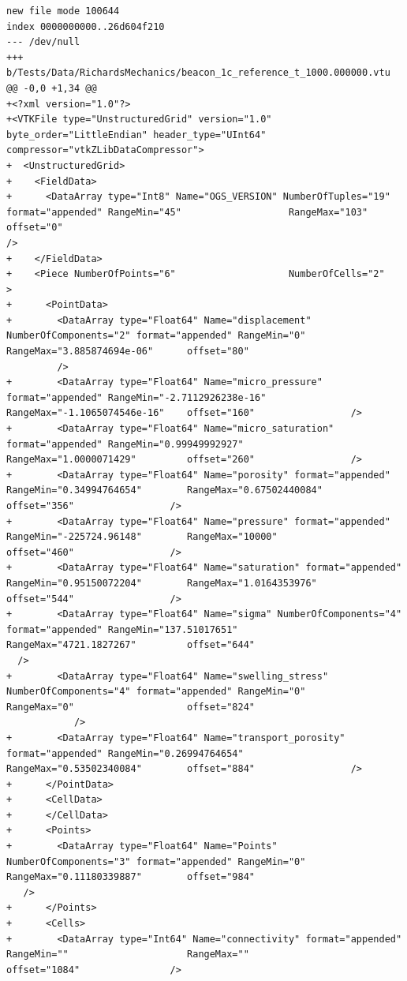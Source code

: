 \documentclass[10pt]{article}
\begin{document}
\begin{lstlisting}
new file mode 100644
index 0000000000..26d604f210
--- /dev/null
+++ b/Tests/Data/RichardsMechanics/beacon_1c_reference_t_1000.000000.vtu
@@ -0,0 +1,34 @@
+<?xml version="1.0"?>
+<VTKFile type="UnstructuredGrid" version="1.0" byte_order="LittleEndian" header_type="UInt64" compressor="vtkZLibDataCompressor">
+  <UnstructuredGrid>
+    <FieldData>
+      <DataArray type="Int8" Name="OGS_VERSION" NumberOfTuples="19" format="appended" RangeMin="45"                   RangeMax="103"                  offset="0"                   
/>
+    </FieldData>
+    <Piece NumberOfPoints="6"                    NumberOfCells="2"                   >
+      <PointData>
+        <DataArray type="Float64" Name="displacement" NumberOfComponents="2" format="appended" RangeMin="0"                    RangeMax="3.885874694e-06"      offset="80"         
         />
+        <DataArray type="Float64" Name="micro_pressure" format="appended" RangeMin="-2.7112926238e-16"    RangeMax="-1.1065074546e-16"    offset="160"                 />
+        <DataArray type="Float64" Name="micro_saturation" format="appended" RangeMin="0.99949992927"        RangeMax="1.0000071429"         offset="260"                 />
+        <DataArray type="Float64" Name="porosity" format="appended" RangeMin="0.34994764654"        RangeMax="0.67502440084"        offset="356"                 />
+        <DataArray type="Float64" Name="pressure" format="appended" RangeMin="-225724.96148"        RangeMax="10000"                offset="460"                 />
+        <DataArray type="Float64" Name="saturation" format="appended" RangeMin="0.95150072204"        RangeMax="1.0164353976"         offset="544"                 />
+        <DataArray type="Float64" Name="sigma" NumberOfComponents="4" format="appended" RangeMin="137.51017651"         RangeMax="4721.1827267"         offset="644"               
  />
+        <DataArray type="Float64" Name="swelling_stress" NumberOfComponents="4" format="appended" RangeMin="0"                    RangeMax="0"                    offset="824"     
            />
+        <DataArray type="Float64" Name="transport_porosity" format="appended" RangeMin="0.26994764654"        RangeMax="0.53502340084"        offset="884"                 />
+      </PointData>
+      <CellData>
+      </CellData>
+      <Points>
+        <DataArray type="Float64" Name="Points" NumberOfComponents="3" format="appended" RangeMin="0"                    RangeMax="0.11180339887"        offset="984"              
   />
+      </Points>
+      <Cells>
+        <DataArray type="Int64" Name="connectivity" format="appended" RangeMin=""                     RangeMax=""                     offset="1084"                />

\end{lstlisting}
\end{document}

